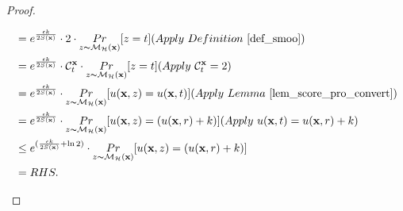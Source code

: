 \documentclass{article}
\begin{document}
\begin{proof}
\begin{itemize}
\begin{itemize}
\begin{equation*}
\begin{split}
      & = e^{\frac{\epsilon k}{2 S(\dataobs)}} \cdot 2 \cdot \hexpmechPr{\dataobs}{z = t}       (Apply\ Definition\ \ref{def_smoo})\\
      & = e^{\frac{\epsilon k}{2 S(\dataobs)}} \cdot \cardinality{\dataobs}{t} \cdot \hexpmechPr{\dataobs}{z = t}         (Apply \ \cardinality{\dataobs}{t} = 2)\\
      & = e^{\frac{\epsilon k}{2 S(\dataobs)}} \cdot \hexpmechPr{\dataobs}{\ux{z} = \ux{t}}               (Apply \ Lemma\ \ref{lem_score_pro_convert})\\
      & = e^{\frac{\epsilon k}{2 S(\dataobs)}} \cdot \hexpmechPr{\dataobs}{\ux{z} = (\ux{r} + k)}         (Apply \ \ux{t} = \ux{r} + k)\\
      & \leq e^{(\frac{\epsilon k}{2 S(\dataobs)} + \ln 2)} \cdot \hexpmechPr{\dataobs}{\ux{z} = (\ux{r} + k)}\\
      & = RHS.
      \end{split}
      \end{equation*}


\end{itemize}
\end{itemize}
\end{proof}
\end{document}
